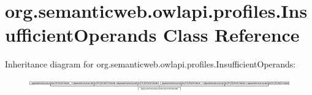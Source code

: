 \hypertarget{classorg_1_1semanticweb_1_1owlapi_1_1profiles_1_1_insufficient_operands}{\section{org.\-semanticweb.\-owlapi.\-profiles.\-Insufficient\-Operands Class Reference}
\label{classorg_1_1semanticweb_1_1owlapi_1_1profiles_1_1_insufficient_operands}
}
Inheritance diagram for org.\-semanticweb.\-owlapi.\-profiles.\-Insufficient\-Operands\-:\begin{figure}[H]
\begin{center}
\leavevmode
\includegraphics[height=0.544218cm]{classorg_1_1semanticweb_1_1owlapi_1_1profiles_1_1_insufficient_operands}
\end{center}
\end{figure}
